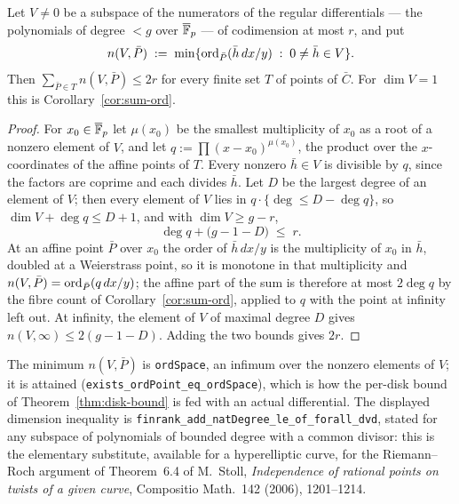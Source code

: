 \begin{corollary}
\label{cor:sum-ord-space}
\leanok
{}
Let $V \ne 0$ be a subspace of the numerators of the regular differentials --- the
polynomials of degree $< g$ over $\overline{\mathbb{F}}_p$ --- of codimension at most $r$, and put
\[
  n(V, \bar P) \;:=\; \min\{\operatorname{ord}_{\bar P}(\bar h\,dx/y) \;:\; 0 \ne \bar h \in V\} .
\]
Then $\sum_{\bar P \in T} n(V, \bar P) \le 2r$ for every finite set $T$ of points of
$\bar C$. For $\dim V = 1$ this is Corollary~\ref{cor:sum-ord}.
\end{corollary}
\begin{proof}
\leanok
For $x_0 \in \overline{\mathbb{F}}_p$ let $\mu(x_0)$ be the smallest multiplicity of $x_0$ as a root of a
nonzero element of $V$, and let $q := \prod (x - x_0)^{\mu(x_0)}$, the product over the
$x$-coordinates of the affine points of $T$. Every nonzero $\bar h \in V$ is divisible by
$q$, since the factors are coprime and each divides $\bar h$. Let $D$ be the largest
degree of an element of $V$; then every element of $V$ lies in $q \cdot \{\deg \le D -
\deg q\}$, so $\dim V + \deg q \le D + 1$, and with $\dim V \ge g - r$,
\[ \deg q + \bigl(g - 1 - D\bigr) \;\le\; r . \]
At an affine point $\bar P$ over $x_0$ the order of $\bar h\,dx/y$ is the multiplicity of
$x_0$ in $\bar h$, doubled at a Weierstrass point, so it is monotone in that multiplicity
and $n(V, \bar P) = \operatorname{ord}_{\bar P}(q\,dx/y)$; the affine part of the sum is therefore at
most $2\deg q$ by the fibre count of Corollary~\ref{cor:sum-ord}, applied to $q$ with the
point at infinity left out. At infinity, the element of $V$ of maximal degree $D$ gives
$n(V, \infty) \le 2(g - 1 - D)$. Adding the two bounds gives $2r$.
\end{proof}

\begin{remark}[Formalization]
The minimum $n(V, \bar P)$ is \texttt{ordSpace}, an infimum over the nonzero elements of
$V$; it is attained (\texttt{exists\_ordPoint\_eq\_ordSpace}), which is how the per-disk
bound of Theorem~\ref{thm:disk-bound} is fed with an actual differential. The
displayed dimension inequality is \texttt{finrank\_add\_natDegree\_le\_of\_forall\_dvd},
stated for any subspace of polynomials of bounded degree with a common divisor: this is
the elementary substitute, available for a hyperelliptic curve, for the Riemann--Roch
argument of Theorem~6.4 of M.~Stoll, \emph{Independence of rational points on twists of
a given curve}, Compositio Math.\ 142 (2006), 1201--1214.
\end{remark}

